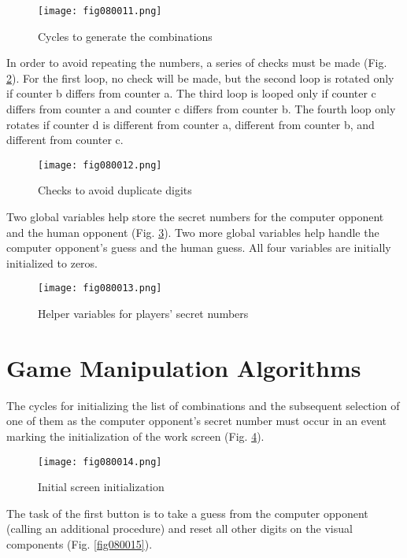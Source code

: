 \begin{figure}[H]
   \centering
   \texttt{[image: fig080011.png]}
   \caption{Cycles to generate the combinations}
\label{fig080011}
\end{figure}

In order to avoid repeating the numbers, a series of checks must be made (Fig. \ref{fig080012}). For the first loop, no check will be made, but the second loop is rotated only if counter b differs from counter a. The third loop is looped only if counter c differs from counter a and counter c differs from counter b. The fourth loop only rotates if counter d is different from counter a, different from counter b, and different from counter c.

\begin{figure}[H]
   \centering
   \texttt{[image: fig080012.png]}
   \caption{Checks to avoid duplicate digits}
\label{fig080012}
\end{figure}

Two global variables help store the secret numbers for the computer opponent and the human opponent (Fig. \ref{fig080013}). Two more global variables help handle the computer opponent's guess and the human guess. All four variables are initially initialized to zeros.

\begin{figure}[H]
   \centering
   \texttt{[image: fig080013.png]}
   \caption{Helper variables for players' secret numbers}
\label{fig080013}
\end{figure}

\section{Game Manipulation Algorithms}

The cycles for initializing the list of combinations and the subsequent selection of one of them as the computer opponent's secret number must occur in an event marking the initialization of the work screen (Fig. \ref{fig080014}).

\begin{figure}[H]
   \centering
   \texttt{[image: fig080014.png]}
   \caption{Initial screen initialization}
\label{fig080014}
\end{figure}

The task of the first button is to take a guess from the computer opponent (calling an additional procedure) and reset all other digits on the visual components (Fig. \ref{fig080015}).

